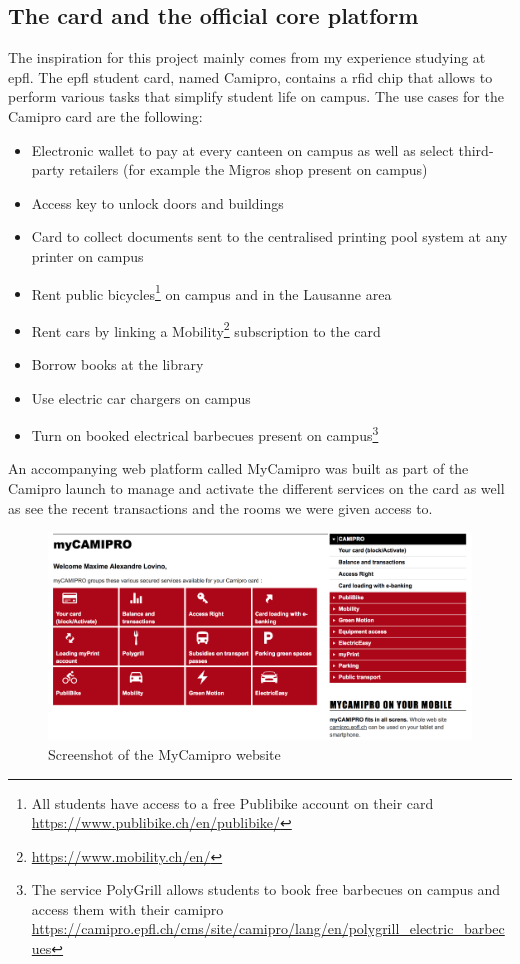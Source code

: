 \documentclass[twoside, openright,11pt,a4paper]{book}
\begin{document}
\subsection{The card and the official core platform}
The inspiration for this project mainly comes from my experience studying at \gls{epfl}. The \gls{epfl} student card, named Camipro\cite{camipro:homepage}, contains a \gls{rfid} chip that allows to perform various tasks that simplify student life on campus. The use cases for the Camipro card are the following:
\begin{itemize}
    \item Electronic wallet to pay at every canteen on campus as well as select third-party retailers (for example the Migros shop present on campus)
    \item Access key to unlock doors and buildings
    \item Card to collect documents sent to the centralised printing pool system at any printer on campus
    \item Rent public bicycles\footnote{All students have access to a free Publibike account on their card \url{https://www.publibike.ch/en/publibike/}} on campus and in the Lausanne area
    \item Rent cars by linking a Mobility\footnote{\url{https://www.mobility.ch/en/}} subscription to the card
    \item Borrow books at the library
    \item Use electric car chargers on campus
    \item Turn on booked electrical barbecues present on campus\footnote{The service PolyGrill allows students to book free barbecues on campus and access them with their camipro \url{https://camipro.epfl.ch/cms/site/camipro/lang/en/polygrill_electric_barbecues}}
\end{itemize}

An accompanying web platform called MyCamipro was built as part of the Camipro launch to manage and activate the different services on the card as well as see the recent transactions and the rooms we were given access to.

\begin{figure}[H]
\begin{center}
	\includegraphics[width=.6\textwidth]{assets/camipro_website.png}
	\caption{Screenshot of the MyCamipro website}
\end{center}
\end{figure}
\end{document}
